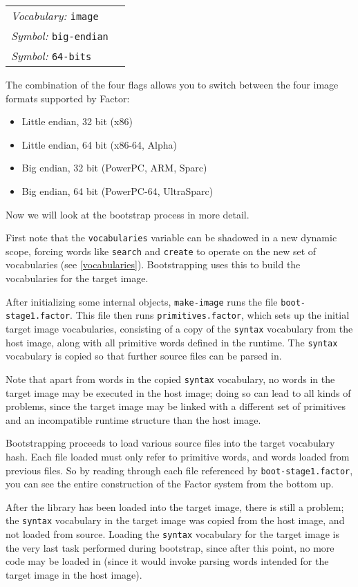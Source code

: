 \documentclass{book}
\newcommand{\vocabulary}[1]{\emph{Vocabulary:} \texttt{#1}&\\}
\newcommand{\symbolword}[1]{\index{\texttt{#1}}\emph{Symbol:} \texttt{#1}&\\}
\newcommand{\wordtable}[1]{


\begin{tabularx}{12cm}{lX}
\hline
#1
\hline
\end{tabularx}

}
\begin{document}
\wordtable{
\vocabulary{image}
\symbolword{big-endian}
\symbolword{64-bits}
}
The combination of the four flags allows you to switch between the four image formats supported by Factor:
\begin{itemize}
\item Little endian, 32 bit (x86)
\item Little endian, 64 bit (x86-64, Alpha)
\item Big endian, 32 bit (PowerPC, ARM, Sparc)
\item Big endian, 64 bit (PowerPC-64, UltraSparc)
\end{itemize}

Now we will look at the bootstrap process in more detail.

First note that the \verb|vocabularies| variable can be shadowed in a new dynamic scope, forcing words like \verb|search| and \verb|create| to operate on the new set of vocabularies (see \ref{vocabularies}). Bootstrapping uses this to build the vocabularies for the target image.

After initializing some internal objects, \verb|make-image| runs the file
\verb|boot-stage1.factor|. This file then runs \verb|primitives.factor|, which sets up the initial target image vocabularies, consisting of a copy of the \verb|syntax| vocabulary from the host image, along with all primitive words defined in the runtime. The \verb|syntax| vocabulary is copied so that further source files can be parsed in.

Note that apart from words in the copied \verb|syntax| vocabulary, no words in the target image may be executed in the host image; doing so can lead to all kinds of problems, since the target image may be linked with a different set of primitives and an incompatible runtime structure than the host image.

Bootstrapping proceeds to load various source files into the
target vocabulary hash. Each file loaded must only refer to primitive
words, and words loaded from previous files. So by reading through each
file referenced by \verb|boot-stage1.factor|, you can see the entire construction of the Factor system from the bottom up.

After the library has been loaded into the target image, there is still a problem; the \verb|syntax| vocabulary in the target image was copied from the host
image, and not loaded from source. Loading the \verb|syntax| vocabulary for the target image is the very last task performed during bootstrap, since after this point, no more code may be loaded in (since it would invoke parsing words intended for the target image in the host image).
\end{document}
